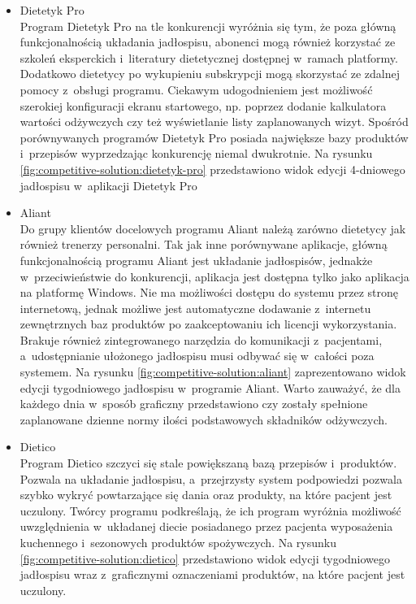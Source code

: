 \begin{itemize}
    \item Dietetyk Pro\\
        Program Dietetyk Pro\cite{url:dietetyk-pro} na tle konkurencji wyróżnia się tym, że poza główną funkcjonalnością układania jadłospisu,
        abonenci mogą również korzystać ze szkoleń eksperckich i~literatury dietetycznej dostępnej w~ramach platformy.
        Dodatkowo dietetycy po wykupieniu subskrypcji mogą skorzystać ze zdalnej pomocy z~obsługi programu.
        Ciekawym udogodnieniem jest możliwość szerokiej konfiguracji ekranu startowego, np. poprzez dodanie kalkulatora wartości odżywczych czy też wyświetlanie listy zaplanowanych wizyt.
        Spośród porównywanych programów Dietetyk Pro posiada największe bazy produktów i~przepisów wyprzedzając konkurencję niemal dwukrotnie.
        Na rysunku \ref{fig:competitive-solution:dietetyk-pro} przedstawiono widok edycji 4-dniowego jadłospisu w~aplikacji Dietetyk Pro


    \item Aliant\\
        Do grupy klientów docelowych programu Aliant\cite{url:aliant} należą zarówno dietetycy jak również trenerzy personalni.
        Tak jak inne porównywane aplikacje, główną funkcjonalnością programu Aliant jest układanie jadłospisów,
        jednakże w~przeciwieństwie do konkurencji, aplikacja jest dostępna tylko jako aplikacja na platformę Windows.
        Nie ma możliwości dostępu do systemu przez stronę internetową, jednak możliwe jest automatyczne dodawanie z~internetu zewnętrznych baz produktów po zaakceptowaniu ich licencji wykorzystania.
        Brakuje również zintegrowanego narzędzia do komunikacji z~pacjentami, a~udostępnianie ułożonego jadłospisu musi odbywać się w~całości poza systemem.
        Na rysunku \ref{fig:competitive-solution:aliant} zaprezentowano widok edycji tygodniowego jadłospisu w~programie Aliant.
        Warto zauważyć, że dla każdego dnia w~sposób graficzny przedstawiono czy zostały spełnione zaplanowane dzienne normy ilości podstawowych składników odżywczych.


    \item Dietico\\
        Program Dietico\cite{url:dietico} szczyci się stale powiększaną bazą przepisów i~produktów.
        Pozwala na układanie jadłospisu,
        a~przejrzysty system podpowiedzi pozwala szybko wykryć powtarzające się dania oraz produkty, na które pacjent jest uczulony.
        Twórcy programu podkreślają, że ich program wyróżnia możliwość uwzględnienia w~układanej diecie posiadanego przez pacjenta wyposażenia kuchennego i~sezonowych produktów spożywczych.
        Na rysunku \ref{fig:competitive-solution:dietico} przedstawiono widok edycji tygodniowego jadłospisu wraz z~graficznymi oznaczeniami produktów, na które pacjent jest uczulony.


\end{itemize}
